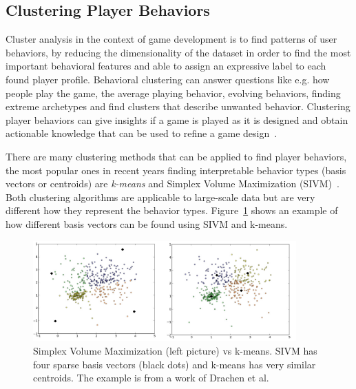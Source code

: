 \subsection{Clustering Player Behaviors}
Cluster analysis in the context of game development is to find patterns of user behaviors, by reducing the dimensionality of the dataset in order to find the most important behavioral features and able to assign an expressive label to each found player profile. Behavioral clustering can answer questions like e.g. how people play the game, the average playing behavior, evolving behaviors, finding extreme archetypes and find clusters that describe unwanted behavior. Clustering player behaviors can give insights if a game is played as it is designed and obtain actionable knowledge that can be used to refine a game design~\citep{Drachen:2012}.

There are many clustering methods that can be applied to find player behaviors, the most popular ones in recent years finding interpretable behavior types (basis vectors or centroids) are \textit{k-means} and Simplex Volume Maximization (SIVM)~\citep{Drachen:2012, Drachen:2013}. Both clustering algorithms are applicable to large-scale data but are very different how they represent the behavior types. Figure~\ref{fig:SIVMvsKmeans} shows an example of how different basis vectors can be found using SIVM and k-means.
\begin{figure}[here]
\centerline{\includegraphics[width=0.9\textwidth]{Figures/SIVMvsKmeans.png}}
\caption{Simplex Volume Maximization (left picture) vs k-means. SIVM has four sparse basis vectors (black dots) and k-means has very similar centroids. The example is from a work of Drachen et al.~\citep{Drachen:2013}}
\label{fig:SIVMvsKmeans}
\end{figure}

